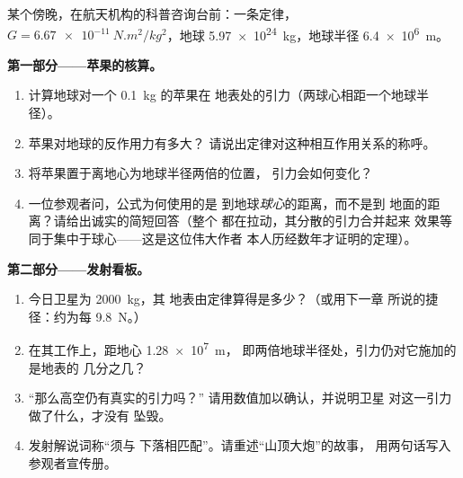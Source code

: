 \begin{problem}\label{pb:g9:gravitation:1}
某个傍晚，在航天机构的科普咨询台前：一条定律，
$G = \qty{6.67e-11}{N.m^2/kg^2}$，地球
\qty{5.97e24}{kg}，地球半径 \qty{6.4e6}{m}。

\medskip\noindent\textbf{第一部分——苹果的核算。}
\begin{enumerate}
  \item 计算地球对一个 \qty{0.1}{kg} 的苹果在
        地表处的引力（两球心相距一个地球半径）。
  \item 苹果对地球的反作用力有多大？
        请说出定律对这种相互作用关系的称呼。
  \item 将苹果置于离地心为地球半径两倍的位置，
        引力会如何变化？
  \item 一位参观者问，公式为何使用的是
        到地球\emph{球心}的距离，而不是到
        地面的距离？请给出诚实的简短回答（整个
        都在拉动，其分散的引力合并起来
        效果等同于集中于球心——这是这位伟大作者
        本人历经数年才证明的定理）。
\end{enumerate}

\medskip\noindent\textbf{第二部分——发射看板。}
\begin{enumerate}[resume]
  \item 今日卫星为 \qty{2000}{kg}，其
        地表由定律算得是多少？（或用下一章
        所说的捷径：约为每
        \qty{9.8}{N}。）
  \item 在其工作上，距地心 \qty{1.28e7}{m}，
        即两倍地球半径处，引力仍对它施加的是地表的
        几分之几？
  \item “那么高空仍有真实的引力吗？”
        请用数值加以确认，并说明卫星
        对这一引力做了什么，才没有
        坠毁。
  \item 发射解说词称“须与
        下落相匹配”。请重述“山顶大炮”的故事，
        用两句话写入参观者宣传册。
\end{enumerate}


\end{problem}
